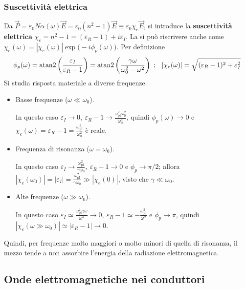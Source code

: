 \documentclass[a4paper]{scrartcl}
\numberwithin{equation}{subsection}
\theoremstyle{style1}
\begin{document}
\subsubsection{Suscettivit\`a elettrica}
Da $\vec{P}=\varepsilon _0 N\alpha (\omega)\vec{E}= \varepsilon _0(n^2 -1) \vec{E}\equiv \varepsilon_0 \chi _e \vec{E}$, si introduce la \textbf{suscettivit\`a elettrica} $\chi _e=n^2-1 = (\varepsilon _R-1) + i \varepsilon _I$. La si pu\`o riscrivere anche come $\chi _e(\omega) = \left\lvert \chi _e(\omega) \right\rvert \exp\big(-i\phi _p(\omega)\big)$. Per definizione
\begin{equation}
	\phi _p(\omega)=\operatorname{atan2}\left(\frac{\varepsilon _I}{\varepsilon _R -1}\right)  = \operatorname{atan2} \left(\frac{\gamma\omega}{\omega_0^2 - \omega^2}\right)  \ ;\hspace{.25cm} \left\lvert \chi _e(\omega) \right\rvert = \sqrt{(\varepsilon _R -1)^2 + \varepsilon _I^2} 
\end{equation}
Si studia risposta materiale a diverse frequenze.
\begin{itemize}
	\item Basse frequenze ($\omega\ll\omega_0$).

		In questo caso $\varepsilon _I \to 0, \ \varepsilon _R -1 \to \frac{\omega_\text{pl}^2 \omega_0^2}{\omega_0^4}$, quindi $\phi _p(\omega) \to 0$ e $\chi _e (\omega)=\varepsilon _R -1=\frac{\omega_\text{pl}^2}{\omega_0^2}$ \`e reale.
	\item Frequenza di risonanza ($\omega=\omega_0$).

		In questo caso $\varepsilon _I \to \frac{\omega_\text{pl}^2}{\gamma\omega_0}, \ \varepsilon _R -1 \to 0$ e $\phi _p \to \pi / 2$; allora $\left\lvert \chi _e(\omega_0) \right\rvert = \left\lvert \varepsilon _I \right\rvert = \frac{\omega_\text{pl}^2}{\gamma\omega_0} \gg \left\lvert \chi _e (0) \right\rvert $, visto che $\gamma\ll\omega_0$.
	\item Alte frequenze ($\omega \gg \omega_0$).

		In questo caso $\varepsilon _I \simeq \frac{\omega_\text{pl}^2 \gamma \omega}{\omega^4} \to 0, \ \varepsilon _R -1 \simeq - \frac{\omega_\text{pl}^2 }{\omega^2}$ e $\phi _p \to \pi$, quindi $\left\lvert \chi _e(\omega \gg\omega_0) \right\rvert \simeq \left\lvert \varepsilon _R -1 \right\rvert \to 0$.
\end{itemize}
Quindi, per frequenze molto maggiori o molto minori di quella di risonanza, il mezzo tende a non assorbire l'energia della radiazione elettromagnetica.
\subsection{Onde elettromagnetiche nei conduttori}
\end{document}
